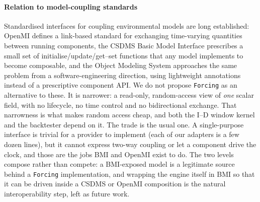 \documentclass[authoryear,preprint,review,12pt]{elsarticle}
\begin{document}
\paragraph{Relation to model-coupling standards}
Standardised interfaces for coupling environmental models are long established:
OpenMI \citep{gregersen2007} defines a link-based standard for exchanging
time-varying quantities between running components, the CSDMS Basic Model
Interface \citep{peckham2013,hutton2020} prescribes a small set of
initialise/update/get--set functions that any model implements to become
composable, and the Object Modeling System \citep{david2013} approaches the same
problem from a software-engineering direction, using lightweight annotations
instead of a prescriptive component API. We do not propose \texttt{Forcing} as an
alternative to these. It is narrower: a read-only, random-access view of \emph{one} scalar field, with no lifecycle, no time control and no bidirectional exchange. That narrowness is what makes random access cheap, and both the I--D window kernel and the backtester depend on it. The trade is the usual one. A single-purpose interface is trivial for a provider to implement (each of our adapters is a few dozen lines), but it cannot express two-way coupling or let a component drive the clock, and those are the jobs BMI and OpenMI exist to do. The two levels compose rather than compete: a BMI-exposed model is a
legitimate source behind a \texttt{Forcing} implementation, and wrapping the
engine itself in BMI so that it can be driven inside a CSDMS or OpenMI
composition is the natural interoperability step, left as future work.
\end{document}
